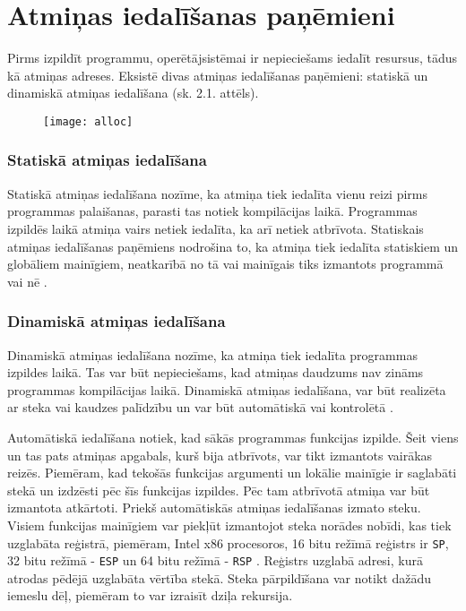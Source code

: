 ﻿\section{Atmiņas iedalīšanas paņēmieni}

Pirms izpildīt programmu, operētājsistēmai ir nepieciešams iedalīt resursus, tādus kā atmiņas adreses.  
Eksistē divas atmiņas iedalīšanas paņēmieni: statiskā un dinamiskā atmiņas iedalīšana (sk. 2.1. attēls). 

\begin{figure}[h]
\begin{center}
\texttt{[image: alloc]}
\end{center}
\caption{\textbf{\fontsize{11}{12}\selectfont {Atmiņas iedalīšanas paņēmienu klasifikācija}}}
\label{fig:alloc}
\end{figure}


\subsubsection{Statiskā atmiņas iedalīšana}
Statiskā atmiņas iedalīšana nozīme, ka atmiņa tiek iedalīta vienu reizi pirms programmas palaišanas, parasti tas notiek kompilācijas laikā.
Programmas izpildēs laikā atmiņa vairs netiek iedalīta, ka arī netiek atbrīvota. 
Statiskais atmiņas iedalīšanas paņēmiens nodrošina to, ka atmiņa tiek iedalīta statiskiem un globāliem mainīgiem, neatkarībā no tā vai mainīgais tiks izmantots programmā vai nē \cite{mem_alloc}.

\subsubsection{Dinamiskā atmiņas iedalīšana}
Dinamiskā atmiņas iedalīšana nozīme, ka atmiņa tiek iedalīta programmas izpildes laikā.
Tas var būt nepieciešams, kad atmiņas daudzums nav zināms programmas kompilācijas laikā. 
Dinamiskā atmiņas iedalīšana, var būt realizēta ar steka vai kaudzes palīdzību un var būt automātiskā vai kontrolētā \cite{SDMA}.

Automātiskā iedalīšana notiek, kad sākās programmas funkcijas izpilde. 
Šeit viens un tas pats atmiņas apgabals, kurš bija atbrīvots, var tikt izmantots  vairākas reizēs. 
Piemēram, kad tekošās funkcijas argumenti un lokālie mainīgie ir saglabāti stekā un izdzēsti pēc šīs funkcijas izpildes.
Pēc tam atbrīvotā atmiņa var būt izmantota atkārtoti. 
Priekš automātiskās atmiņas iedalīšanas izmato steku.
Visiem funkcijas mainīgiem var piekļūt izmantojot steka norādes nobīdi, kas tiek uzglabāta reģistrā, piemēram,  
Intel x86 procesoros, 16 bitu režīmā reģistrs ir \texttt{SP}, 32 bitu režīmā - \texttt{ESP} un 64 bitu režīmā - \texttt{RSP} \cite{JCL}.
Reģistrs uzglabā adresi, kurā atrodas pēdējā uzglabāta vērtība stekā.
Steka pārpildīšana var notikt dažādu iemeslu dēļ, piemēram to var izraisīt dziļa rekursija.
 
